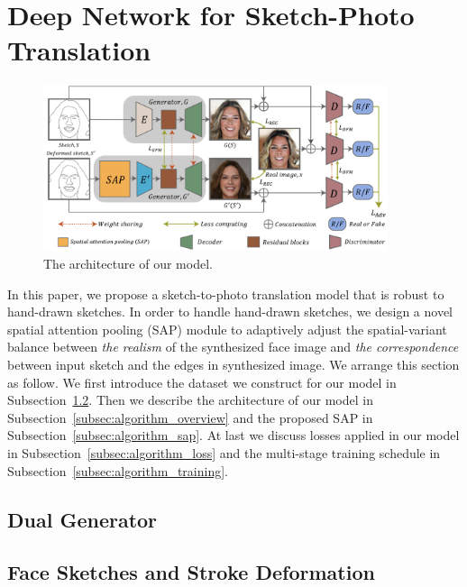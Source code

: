 
\section{Deep Network for Sketch-Photo Translation}
\label{sec:network}

\begin{figure}
	\includegraphics[width=0.9\textwidth]{figs/architecture}
	\caption{The architecture of our model.}
	\label{fig:architecture}
\end{figure}
%
In this paper, we propose a sketch-to-photo translation model that is robust to hand-drawn sketches. In order to handle hand-drawn sketches, we design a novel spatial attention pooling (SAP) module to adaptively adjust the spatial-variant balance between \textit{the realism} of the synthesized face image and \textit{the correspondence} between input sketch and the edges in synthesized image. 
We arrange this section as follow. We first introduce the dataset we construct for our model in Subsection~\ref{subsec:algorithm_data}.
Then we describe the architecture of our model in Subsection~\ref{subsec:algorithm_overview} and the proposed SAP in Subsection~\ref{subsec:algorithm_sap}.
At last we discuss losses applied in our model in Subsection~\ref{subsec:algorithm_loss} and the multi-stage training schedule in Subsection~\ref{subsec:algorithm_training}.

%
\subsection{Dual Generator}



\subsection{Face Sketches and Stroke Deformation}
\label{subsec:algorithm_data}




